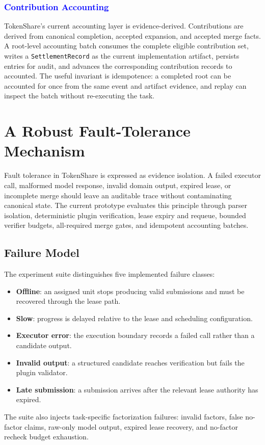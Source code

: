 \documentclass{article}
\theoremstyle{plain}
\begin{document}
\subsubsection{\textcolor{blue}{Contribution Accounting}}

{\color{blue}
TokenShare's current accounting layer is evidence-derived. Contributions are derived from canonical completion, accepted expansion, and accepted merge facts. A root-level accounting batch consumes the complete eligible contribution set, writes a \texttt{SettlementRecord} as the current implementation artifact, persists entries for audit, and advances the corresponding contribution records to accounted. The useful invariant is idempotence: a completed root can be accounted for once from the same event and artifact evidence, and replay can inspect the batch without re-executing the task.
}




\section{A Robust Fault-Tolerance Mechanism}

{\color{blue}
Fault tolerance in TokenShare is expressed as evidence isolation. A failed executor call, malformed model response, invalid domain output, expired lease, or incomplete merge should leave an auditable trace without contaminating canonical state. The current prototype evaluates this principle through parser isolation, deterministic plugin verification, lease expiry and requeue, bounded verifier budgets, all-required merge gates, and idempotent accounting batches.
}

\subsection{Failure Model}

{\color{blue}
The experiment suite distinguishes five implemented failure classes:
\begin{itemize}
\item \textbf{Offline}: an assigned unit stops producing valid submissions and must be recovered through the lease path.
\item \textbf{Slow}: progress is delayed relative to the lease and scheduling configuration.
\item \textbf{Executor error}: the execution boundary records a failed call rather than a candidate output.
\item \textbf{Invalid output}: a structured candidate reaches verification but fails the plugin validator.
\item \textbf{Late submission}: a submission arrives after the relevant lease authority has expired.
\end{itemize}
The suite also injects task-specific factorization failures: invalid factors, false no-factor claims, raw-only model output, expired lease recovery, and no-factor recheck budget exhaustion.
}
\end{document}
